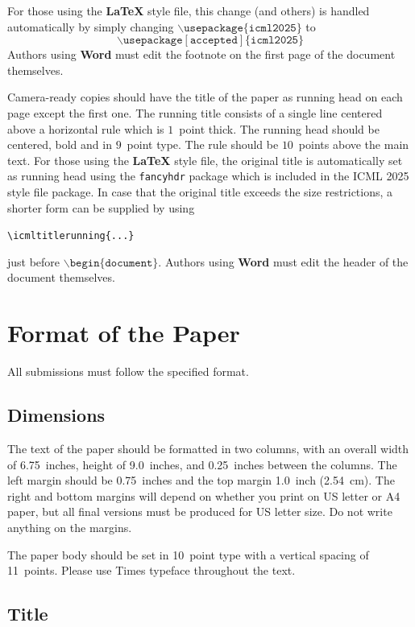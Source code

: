 \documentclass{article}
\theoremstyle{plain}
\theoremstyle{definition}
\theoremstyle{remark}
\begin{document}
For those using the \textbf{\LaTeX} style file, this change (and others) is
handled automatically by simply changing
$\mathtt{\backslash usepackage\{icml2025\}}$ to
$$\mathtt{\backslash usepackage[accepted]\{icml2025\}}$$
Authors using \textbf{Word} must edit the
footnote on the first page of the document themselves.

Camera-ready copies should have the title of the paper as running head
on each page except the first one. The running title consists of a
single line centered above a horizontal rule which is $1$~point thick.
The running head should be centered, bold and in $9$~point type. The
rule should be $10$~points above the main text. For those using the
\textbf{\LaTeX} style file, the original title is automatically set as running
head using the \texttt{fancyhdr} package which is included in the ICML
2025 style file package. In case that the original title exceeds the
size restrictions, a shorter form can be supplied by using

\verb|\icmltitlerunning{...}|

just before $\mathtt{\backslash begin\{document\}}$.
Authors using \textbf{Word} must edit the header of the document themselves.

\section{Format of the Paper}

All submissions must follow the specified format.

\subsection{Dimensions}




The text of the paper should be formatted in two columns, with an
overall width of 6.75~inches, height of 9.0~inches, and 0.25~inches
between the columns. The left margin should be 0.75~inches and the top
margin 1.0~inch (2.54~cm). The right and bottom margins will depend on
whether you print on US letter or A4 paper, but all final versions
must be produced for US letter size.
Do not write anything on the margins.

The paper body should be set in 10~point type with a vertical spacing
of 11~points. Please use Times typeface throughout the text.

\subsection{Title}
\end{document}
